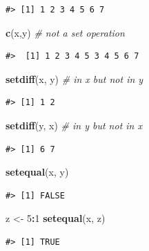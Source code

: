\documentclass[]{book}
\newenvironment{Shaded}{\begin{snugshade}}{\end{snugshade}}
\newcommand{\KeywordTok}[1]{\textcolor[rgb]{0.13,0.29,0.53}{\textbf{#1}}}
\newcommand{\DecValTok}[1]{\textcolor[rgb]{0.00,0.00,0.81}{#1}}
\newcommand{\StringTok}[1]{\textcolor[rgb]{0.31,0.60,0.02}{#1}}
\newcommand{\CommentTok}[1]{\textcolor[rgb]{0.56,0.35,0.01}{\textit{#1}}}
\newcommand{\OperatorTok}[1]{\textcolor[rgb]{0.81,0.36,0.00}{\textbf{#1}}}
\newcommand{\NormalTok}[1]{#1}
\theoremstyle{definition}
\theoremstyle{definition}
\theoremstyle{definition}
\theoremstyle{remark}
\begin{document}
\begin{verbatim}
#> [1] 1 2 3 4 5 6 7
\end{verbatim}

\begin{Shaded}
\begin{Highlighting}[]
\KeywordTok{c}\NormalTok{(x,y)          }\CommentTok{# not a set operation}
\end{Highlighting}
\end{Shaded}

\begin{verbatim}
#>  [1] 1 2 3 4 5 3 4 5 6 7
\end{verbatim}

\begin{Shaded}
\begin{Highlighting}[]
\KeywordTok{setdiff}\NormalTok{(x, y)   }\CommentTok{# in x but not in y}
\end{Highlighting}
\end{Shaded}

\begin{verbatim}
#> [1] 1 2
\end{verbatim}

\begin{Shaded}
\begin{Highlighting}[]
\KeywordTok{setdiff}\NormalTok{(y, x)   }\CommentTok{# in y but not in x}
\end{Highlighting}
\end{Shaded}

\begin{verbatim}
#> [1] 6 7
\end{verbatim}

\begin{Shaded}
\begin{Highlighting}[]
\KeywordTok{setequal}\NormalTok{(x, y)}
\end{Highlighting}
\end{Shaded}

\begin{verbatim}
#> [1] FALSE
\end{verbatim}

\begin{Shaded}
\begin{Highlighting}[]
\NormalTok{z <-}\StringTok{ }\DecValTok{5}\OperatorTok{:}\DecValTok{1}
\KeywordTok{setequal}\NormalTok{(x, z)}
\end{Highlighting}
\end{Shaded}

\begin{verbatim}
#> [1] TRUE
\end{verbatim}
\end{document}
